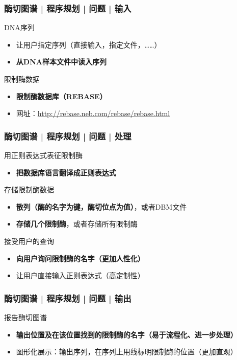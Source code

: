 \begin{frame}
  \frametitle{酶切图谱 | 程序规划 | 问题 | 输入}
  \begin{block}{DNA序列}
    \begin{itemize}
      \item 让用户指定序列（直接输入，指定文件，……）
      \item \textbf{从DNA样本文件中读入序列}
    \end{itemize}
  \end{block}
  \pause
  \begin{block}{限制酶数据}
    \begin{itemize}
      \item \textbf{限制酶数据库（REBASE）}
      \item 网址：\href{http://rebase.neb.com/rebase/rebase.html}{http://rebase.neb.com/rebase/rebase.html}
    \end{itemize}
  \end{block}
\end{frame}

\begin{frame}
  \frametitle{酶切图谱 | 程序规划 | 问题 | 处理}
  \begin{block}{用正则表达式表征限制酶}
    \begin{itemize}
      \item \textbf{把数据库语言翻译成正则表达式}
    \end{itemize}
  \end{block}
  \pause
  \begin{block}{存储限制酶数据}
    \begin{itemize}
      \item \textbf{散列（酶的名字为键，酶切位点为值）}，或者DBM文件
      \item \textbf{存储几个限制酶}，或者存储所有限制酶
    \end{itemize}
  \end{block}
  \pause
  \begin{block}{接受用户的查询}
    \begin{itemize}
      \item \textbf{向用户询问限制酶的名字（更加人性化）}
      \item 让用户直接输入正则表达式（高定制性）
    \end{itemize}
  \end{block}
\end{frame}

\begin{frame}
  \frametitle{酶切图谱 | 程序规划 | 问题 | 输出}
  \begin{block}{报告酶切图谱}
    \begin{itemize}
      \item \textbf{输出位置及在该位置找到的限制酶的名字（易于流程化、进一步处理）}
      \item 图形化展示：输出序列，在序列上用线标明限制酶的位置（更加直观）
    \end{itemize}
  \end{block}
\end{frame}

